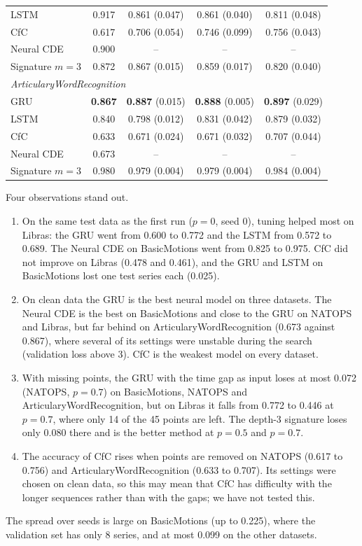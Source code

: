 \begin{table}[ht]
\begin{tabular}{lcccc}
LSTM & 0.917 & 0.861 (0.047) & 0.861 (0.040) & 0.811 (0.048) \\
CfC & 0.617 & 0.706 (0.054) & 0.746 (0.099) & 0.756 (0.043) \\
Neural CDE & 0.900 & -- & -- & -- \\
Signature $m=3$ & 0.872 & 0.867 (0.015) & 0.859 (0.017) & 0.820 (0.040) \\
\midrule
\multicolumn{5}{l}{\emph{ArticularyWordRecognition}} \\
GRU & \textbf{0.867} & \textbf{0.887} (0.015) & \textbf{0.888} (0.005) & \textbf{0.897} (0.029) \\
LSTM & 0.840 & 0.798 (0.012) & 0.831 (0.042) & 0.879 (0.032) \\
CfC & 0.633 & 0.671 (0.024) & 0.671 (0.032) & 0.707 (0.044) \\
Neural CDE & 0.673 & -- & -- & -- \\
Signature $m=3$ & 0.980 & 0.979 (0.004) & 0.979 (0.004) & 0.984 (0.004) \\
\bottomrule
\end{tabular}
\end{table}

Four observations stand out.
\begin{enumerate}
\item On the same test data as the first run ($p = 0$, seed 0), tuning
helped most on Libras: the GRU went from 0.600 to 0.772 and the LSTM from
0.572 to 0.689. The Neural CDE on BasicMotions went from 0.825 to 0.975.
CfC did not improve on Libras (0.478 and 0.461), and the GRU and LSTM on
BasicMotions lost one test series each (0.025).
\item On clean data the GRU is the best neural model on three datasets.
The Neural CDE is the best on BasicMotions and close to the GRU on NATOPS
and Libras, but far behind on ArticularyWordRecognition (0.673 against
0.867), where several of its settings were unstable during the search
(validation loss above 3). CfC is the weakest model on every dataset.
\item With missing points, the GRU with the time gap as input loses at
most 0.072 (NATOPS, $p = 0.7$) on BasicMotions, NATOPS and
ArticularyWordRecognition, but on
Libras it falls from 0.772 to 0.446 at $p = 0.7$, where only 14 of the 45
points are left. The depth-3 signature loses only 0.080 there and is the
better method at $p = 0.5$ and $p = 0.7$.
\item The accuracy of CfC rises when points are removed on NATOPS (0.617
to 0.756) and ArticularyWordRecognition (0.633 to 0.707). Its settings
were chosen on clean data, so this may mean that CfC has difficulty with
the longer sequences rather than with the gaps; we have not tested this.
\end{enumerate}
The spread over seeds is large on BasicMotions (up to 0.225), where the
validation set has only 8 series, and at most 0.099 on the other datasets.

